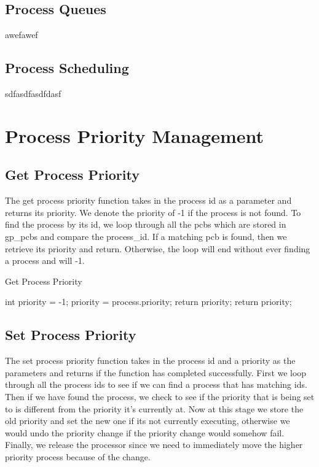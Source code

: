 \documentclass[12pt]{report}
\begin{document}
\subsection{Process Queues}
awefawef

\subsection{Process Scheduling}
sdfasdfasdfdasf


\section{Process Priority Management}

\subsection{Get Process Priority}

The get process priority function takes in the process id as a parameter and returns its priority. We denote the priority of -1 if the process is not found. To find the process by its id, we loop through all the pcbs which are stored in gp_pcbs and compare the process_id. If a matching pcb is found, then we retrieve its priority and return. Otherwise, the loop will end without ever finding a process and will -1.

\begin{algorithm}[H]
  \caption{Get Process Priority}
  \begin{algorithmic}[1]
  \State int priority = -1;
      \State priority = process.priority;
      \State return priority;
     \EndIf
  \EndFor
  \State return priority;
  \EndFunction
  \end{algorithmic}
\end{algorithm}

\subsection{Set Process Priority}

The set process priority function takes in the process id and a priority as the parameters and returns if the function has completed successfully. First we loop through all the process ids to see if we can find a process that has matching ids. Then if we have found the process, we check to see if the priority that is being set to is different from the priority it's currently at. Now at this stage we store the old priority and set the new one if its not currently executing, otherwise we would undo the priority change if the priority change would somehow fail. Finally, we release the processor since we need to immediately move the higher priority process because of the change.
\end{document}
